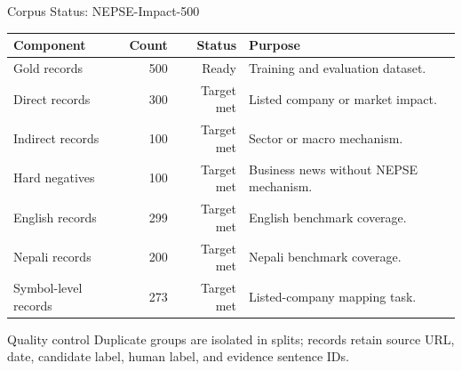 \documentclass[aspectratio=169,11pt,hyperref={bookmarks=false}]{beamer}
\newcommand{\smallsep}{\vspace{0.35em}}
\newcommand{\good}[1]{\textcolor{MarketGreen}{#1}}
\begin{document}
\begin{frame}{Corpus Status: NEPSE-Impact-500}
  \small
  \begin{tabularx}{\textwidth}{@{}lrrX@{}}
    \toprule
    Component & Count & Status & Purpose \\
    \midrule
    Gold records & 500 & \good{Ready} & Training and evaluation dataset. \\
    Direct records & 300 & \good{Target met} & Listed company or market impact. \\
    Indirect records & 100 & \good{Target met} & Sector or macro mechanism. \\
    Hard negatives & 100 & \good{Target met} & Business news without NEPSE mechanism. \\
    English records & 299 & \good{Target met} & English benchmark coverage. \\
    Nepali records & 200 & \good{Target met} & Nepali benchmark coverage. \\
    Symbol-level records & 273 & \good{Target met} & Listed-company mapping task. \\
    \bottomrule
  \end{tabularx}
  \smallsep
  \begin{block}{Quality control}
    Duplicate groups are isolated in splits; records retain source URL, date, candidate label, human label, and evidence sentence IDs.
  \end{block}
\end{frame}
\end{document}
